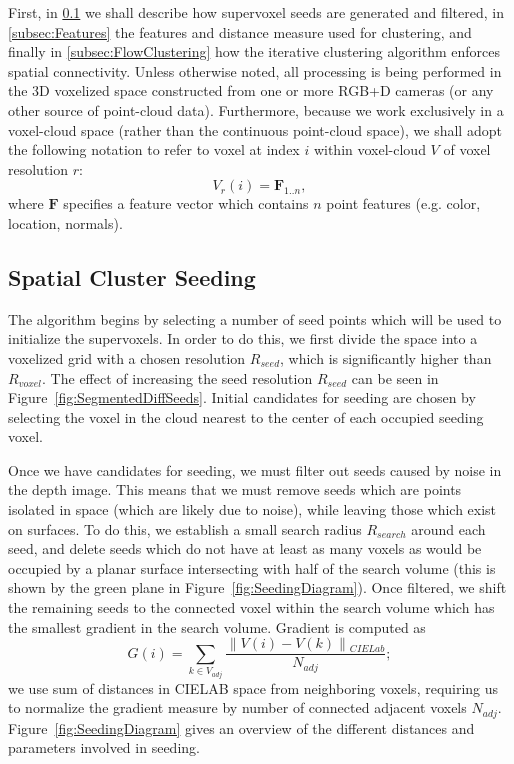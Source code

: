 First, in \ref{subsec:Seeding} we shall describe how supervoxel seeds are generated and filtered, in \ref{subsec:Features} the features and distance measure used for clustering, and finally in \ref{subsec:FlowClustering} how the iterative clustering algorithm enforces spatial connectivity. Unless otherwise noted, all processing is being performed in the 3D voxelized space constructed from one or more RGB+D cameras (or any other source of point-cloud data). Furthermore, because we work exclusively in a voxel-cloud space (rather than the continuous point-cloud space), we shall adopt the following notation to refer to voxel at index $i$ within voxel-cloud $V$ of voxel resolution $r$:
\begin{equation} \label{eqn:Voxel}
{V}_{r}(i) = \mathbf{F}_{1..n}, 
\end{equation}
where $\mathbf{F}$ specifies a feature vector which contains $n$ point features (e.g. color, location, normals). 

\subsection{Spatial Cluster Seeding}
\label{subsec:Seeding}
The algorithm begins by selecting a number of seed points which will be used to initialize the supervoxels. In order to do this, we first divide the space into a voxelized grid with a chosen resolution ${R}_{seed}$, which is significantly higher than ${R}_{voxel}$. The effect of increasing the seed resolution ${R}_{seed}$ can be seen in Figure~\ref{fig:SegmentedDiffSeeds}. Initial candidates for seeding are chosen by selecting the voxel in the cloud nearest to the center of each occupied seeding voxel.    

Once we have candidates for seeding, we must filter out seeds caused by noise in the depth image. This means that we must remove seeds which are points isolated in space (which are likely due to noise), while leaving those which exist on surfaces. To do this, we establish a small search radius ${R}_{search}$ around each seed, and delete seeds which do not have at least as many voxels as would be occupied by a planar surface intersecting with half of the search volume (this is shown by the green plane in Figure~\ref{fig:SeedingDiagram}). Once filtered, we shift the remaining seeds to the connected voxel within the search volume which has the smallest gradient in the search volume. Gradient is computed as
\begin{equation} \label{eqn:Gradient}
\mathit{G}(i) = \sum_{k\in{V}_{adj}}{\frac{\parallel{V(i)-V(k)}\parallel{}_{CIELab}}{{N}_{adj}}};
\end{equation}
we use sum of distances in CIELAB space from neighboring voxels, requiring us to normalize the gradient measure by number of connected adjacent voxels ${N}_{adj}$. Figure~\ref{fig:SeedingDiagram} gives an overview of the different distances and parameters involved in seeding.

